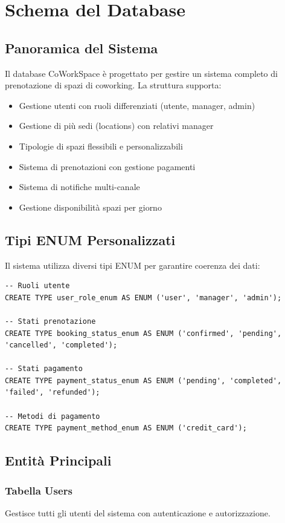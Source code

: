 \section{Schema del Database}

\subsection{Panoramica del Sistema}
Il database CoWorkSpace è progettato per gestire un sistema completo di prenotazione di spazi di coworking. La struttura supporta:
\begin{itemize}
    \item Gestione utenti con ruoli differenziati (utente, manager, admin)
    \item Gestione di più sedi (locations) con relativi manager
    \item Tipologie di spazi flessibili e personalizzabili
    \item Sistema di prenotazioni con gestione pagamenti
    \item Sistema di notifiche multi-canale
    \item Gestione disponibilità spazi per giorno
\end{itemize}

\subsection{Tipi ENUM Personalizzati}
Il sistema utilizza diversi tipi ENUM per garantire coerenza dei dati:

\begin{lstlisting}[caption=Definizione Tipi ENUM]
-- Ruoli utente
CREATE TYPE user_role_enum AS ENUM ('user', 'manager', 'admin');

-- Stati prenotazione
CREATE TYPE booking_status_enum AS ENUM ('confirmed', 'pending', 'cancelled', 'completed');

-- Stati pagamento
CREATE TYPE payment_status_enum AS ENUM ('pending', 'completed', 'failed', 'refunded');

-- Metodi di pagamento
CREATE TYPE payment_method_enum AS ENUM ('credit_card');
\end{lstlisting}

\newpage

\subsection{Entità Principali}

\subsubsection{Tabella Users}
Gestisce tutti gli utenti del sistema con autenticazione e autorizzazione.

